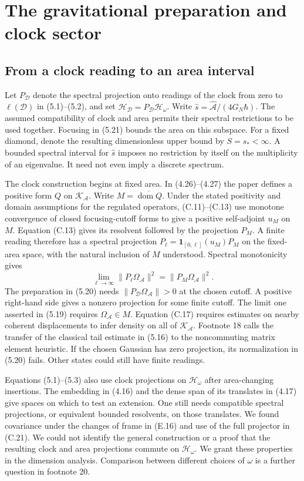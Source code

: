 \documentclass[11pt]{article}
\newcommand{\HH}{\mathcal H_{\mathcal D}}
\newcommand{\areaop}{\hat s}
\newcommand{\parttitle}[2]{\section{#1}}
\begin{document}
\parttitle{The gravitational preparation and clock sector}{Preparing the diamond}\label{sec:preparation}
\subsection{From a clock reading to an area interval}
Let $P_{\mathcal D}$ denote the spectral projection onto readings of the clock from zero to $\ell(\mathcal D)$ in (5.1)--(5.2), and set $\HH=P_{\mathcal D}\mathcal H_\omega$. Write $\areaop=\widehat{\mathcal A}/(4G_N\hbar)$. The assumed compatibility of clock and area permits their spectral restrictions to be used together. Focusing in (5.21) bounds the area on this subspace. For a fixed diamond, denote the resulting dimensionless upper bound by $S=s_*<\infty$. A bounded spectral interval for $\areaop$ imposes no restriction by itself on the multiplicity of an eigenvalue. It need not even imply a discrete spectrum.

The clock construction begins at fixed area. In (4.26)--(4.27) the paper defines a positive form $Q$ on $\mathcal K_{\mathcal A}$. Write $M=\overline{\operatorname{dom}Q}$. Under the stated positivity and domain assumptions for the regulated operators, (C.11)--(C.13) use monotone convergence of closed focusing-cutoff forms to give a positive self-adjoint $u_M$ on $M$. Equation (C.13) gives its resolvent followed by the projection $P_M$. A finite reading therefore has a spectral projection $P_\ell=\mathbf 1_{[0,\ell]}(u_M)P_M$ on the fixed-area space, with the natural inclusion of $M$ understood. Spectral monotonicity gives
\[
 \lim_{\ell\to\infty}\|P_\ell\Omega_{\mathcal A}\|^2
      =\|P_M\Omega_{\mathcal A}\|^2 .
\]
The preparation in (5.20) needs $\|P_{\mathcal D}\Omega_{\mathcal A}\|>0$ at the chosen cutoff. A positive right-hand side gives a nonzero projection for some finite cutoff. The limit one asserted in (5.19) requires $\Omega_{\mathcal A}\in M$. Equation (C.17) requires estimates on nearby coherent displacements to infer density on all of $\mathcal K_{\mathcal A}$. Footnote 18 calls the transfer of the classical tail estimate in (5.16) to the noncommuting matrix element heuristic. If the chosen Gaussian has zero projection, its normalization in (5.20) fails. Other states could still have finite readings.

Equations (5.1)--(5.3) also use clock projections on $\mathcal H_\omega$ after area-changing insertions. The embedding in (4.16) and the dense span of its translates in (4.17) give spaces on which to test an extension. One still needs compatible spectral projections, or equivalent bounded resolvents, on those translates. We found covariance under the changes of frame in (E.16) and use of the full projector in (C.21). We could not identify the general construction or a proof that the resulting clock and area projections commute on $\mathcal H_\omega$. We grant these properties in the dimension analysis. Comparison between different choices of $\omega$ is a further question in footnote 20.
\end{document}
